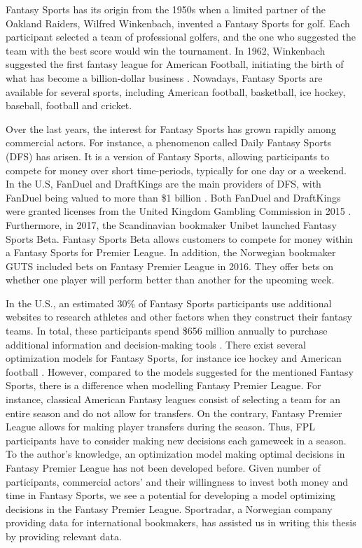 \newpar


Fantasy Sports has its origin from the 1950s when a limited partner of the Oakland Raiders, Wilfred Winkenbach, invented a Fantasy Sports for golf. Each participant selected a team of professional golfers, and the one who suggested the team with the best score would win the tournament. In 1962, Winkenbach suggested the first fantasy league for American Football, initiating the birth of what has become a billion-dollar business \citep{mccracken2012culturematic}. Nowadays, Fantasy Sports are available for several sports, including American football, basketball, ice hockey, baseball, football and cricket.  


\newpar

Over the last years, the interest for Fantasy Sports has grown rapidly among commercial actors. For instance, a phenomenon called Daily Fantasy Sports (DFS) has arisen. It is a version of Fantasy Sports, allowing participants to compete for money over short time-periods, typically for one day or a weekend. In the U.S, FanDuel and DraftKings are the main providers of DFS, with FanDuel being valued to more than \$1 billion \citep{forbes_fanduel}. Both FanDuel and DraftKings were granted licenses from the United Kingdom Gambling Commission in 2015 \citep{Purdum}. Furthermore, in 2017, the Scandinavian bookmaker Unibet launched Fantasy Sports Beta. Fantasy Sports Beta allows customers to compete for money within a Fantasy Sports for Premier League. In addition, the Norwegian bookmaker GUTS included bets on Fantasy Premier League in 2016. They offer bets on whether one player will perform better than another for the upcoming week.

\newpar

In the U.S., an estimated 30\% of Fantasy Sports participants use additional websites to research athletes and other factors when they construct their fantasy teams. In total, these participants spend \$656 million annually to purchase additional information and decision-making tools \citep{fantasy_decision_tools}. There exist several optimization models for Fantasy Sports, for instance ice hockey \citep{drafting_hockey_pools} and American football \citep{Fry}. However, compared to the models suggested for the mentioned Fantasy Sports, there is a difference when modelling Fantasy Premier League. For instance, classical American Fantasy leagues consist of selecting a team for an entire season and do not allow for transfers. On the contrary, Fantasy Premier League allows for making player transfers during the season. Thus, FPL participants have to consider making new decisions each gameweek in a season. To the author's knowledge, an optimization model making optimal decisions in Fantasy Premier League has not been developed before. Given number of participants, commercial actors' and their willingness to invest both money and time in Fantasy Sports, we see a potential for developing a model optimizing decisions in the Fantasy Premier League. Sportradar, a Norwegian company providing data for international bookmakers, has assisted us in writing this thesis by providing relevant data.

